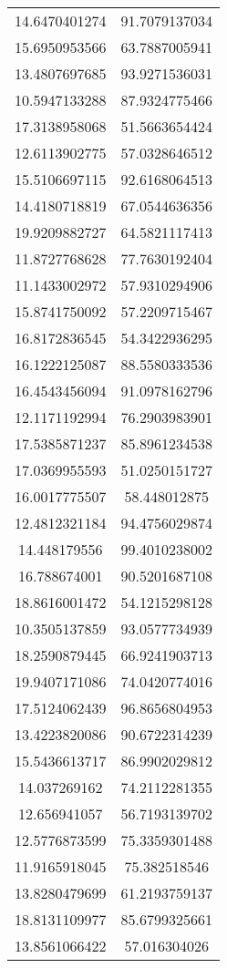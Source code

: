 \begin{table}
\begin{tabular}{cc}
14.6470401274 & 91.7079137034 \\
15.6950953566 & 63.7887005941 \\
13.4807697685 & 93.9271536031 \\
10.5947133288 & 87.9324775466 \\
17.3138958068 & 51.5663654424 \\
12.6113902775 & 57.0328646512 \\
15.5106697115 & 92.6168064513 \\
14.4180718819 & 67.0544636356 \\
19.9209882727 & 64.5821117413 \\
11.8727768628 & 77.7630192404 \\
11.1433002972 & 57.9310294906 \\
15.8741750092 & 57.2209715467 \\
16.8172836545 & 54.3422936295 \\
16.1222125087 & 88.5580333536 \\
16.4543456094 & 91.0978162796 \\
12.1171192994 & 76.2903983901 \\
17.5385871237 & 85.8961234538 \\
17.0369955593 & 51.0250151727 \\
16.0017775507 & 58.448012875 \\
12.4812321184 & 94.4756029874 \\
14.448179556 & 99.4010238002 \\
16.788674001 & 90.5201687108 \\
18.8616001472 & 54.1215298128 \\
10.3505137859 & 93.0577734939 \\
18.2590879445 & 66.9241903713 \\
19.9407171086 & 74.0420774016 \\
17.5124062439 & 96.8656804953 \\
13.4223820086 & 90.6722314239 \\
15.5436613717 & 86.9902029812 \\
14.037269162 & 74.2112281355 \\
12.656941057 & 56.7193139702 \\
12.5776873599 & 75.3359301488 \\
11.9165918045 & 75.382518546 \\
13.8280479699 & 61.2193759137 \\
18.8131109977 & 85.6799325661 \\
13.8561066422 & 57.016304026 \\

\end{tabular}
\end{table}
